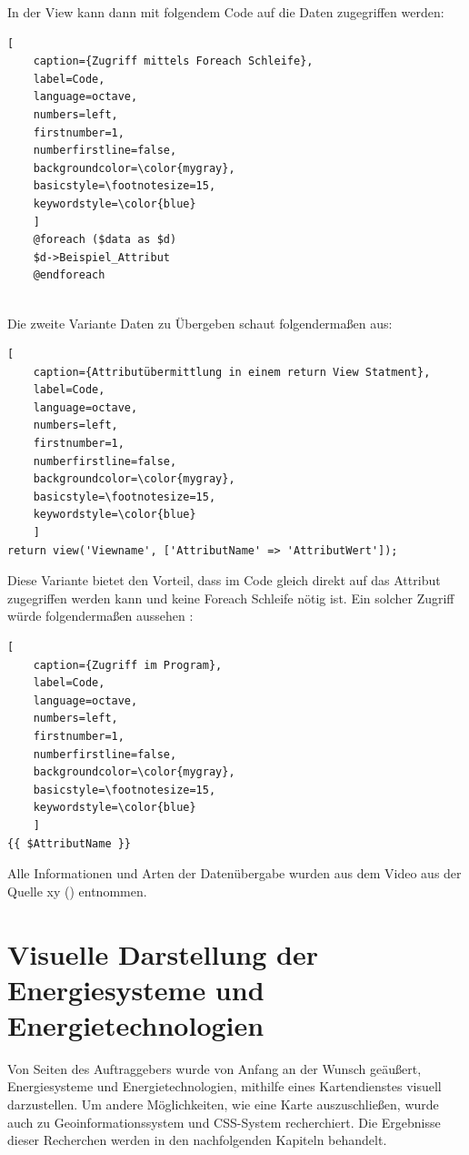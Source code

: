 In der View kann dann mit folgendem Code auf die Daten zugegriffen werden:
\renewcommand{\lstlistingname}{Quellcode}

\begin{lstlisting}[
	caption={Zugriff mittels Foreach Schleife},
	label=Code,
	language=octave,
	numbers=left,
	firstnumber=1,
	numberfirstline=false,
	backgroundcolor=\color{mygray},
	basicstyle=\footnotesize=15,
	keywordstyle=\color{blue}
	]
	@foreach ($data as $d)
	$d->Beispiel_Attribut 
	@endforeach
	
\end{lstlisting}

Die zweite Variante Daten zu Übergeben schaut folgendermaßen aus:
\renewcommand{\lstlistingname}{Quellcode}

\begin{lstlisting}[
	caption={Attributübermittlung in einem return View Statment},
	label=Code,
	language=octave,
	numbers=left,
	firstnumber=1,
	numberfirstline=false,
	backgroundcolor=\color{mygray},
	basicstyle=\footnotesize=15,
	keywordstyle=\color{blue}
	]
return view('Viewname', ['AttributName' => 'AttributWert']);
\end{lstlisting}
\newpage

Diese Variante bietet den Vorteil, dass im Code gleich direkt auf das Attribut zugegriffen werden kann und keine  Foreach Schleife nötig ist. Ein solcher Zugriff würde folgendermaßen aussehen : 
\renewcommand{\lstlistingname}{Quellcode}

\begin{lstlisting}[
	caption={Zugriff im Program},
	label=Code,
	language=octave,
	numbers=left,
	firstnumber=1,
	numberfirstline=false,
	backgroundcolor=\color{mygray},
	basicstyle=\footnotesize=15,
	keywordstyle=\color{blue}
	]
{{ $AttributName }}
\end{lstlisting}


Alle Informationen und Arten der Datenübergabe wurden aus dem Video aus der Quelle xy () entnommen.


\section {Visuelle Darstellung der Energiesysteme und Energietechnologien }
Von Seiten des Auftraggebers wurde von Anfang an der Wunsch geäußert, Energiesysteme und Energietechnologien, mithilfe eines Kartendienstes visuell darzustellen. Um andere Möglichkeiten, wie eine Karte auszuschließen, wurde auch zu Geoinformationssystem und CSS-System recherchiert. Die Ergebnisse dieser Recherchen werden in den nachfolgenden Kapiteln behandelt. 

